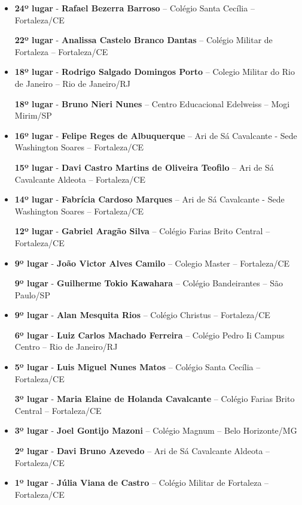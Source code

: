 \documentclass{article}
\begin{document}
\begin{itemize}
\item
\textbf{24º lugar} - \textbf{Rafael Bezerra Barroso} – Colégio Santa Cecília – Fortaleza/CE


\textbf{22º lugar} - \textbf{Analissa Castelo Branco Dantas} – Colégio Militar de Fortaleza – Fortaleza/CE



\item
\textbf{18º lugar} - \textbf{Rodrigo Salgado Domingos Porto} – Colegio Militar do Rio de Janeiro – Rio de Janeiro/RJ


\textbf{18º lugar} - \textbf{Bruno Nieri Nunes} – Centro Educacional Edelweiss – Mogi Mirim/SP



\item
\textbf{16º lugar} - \textbf{Felipe Reges de Albuquerque} – Ari de Sá Cavalcante - Sede Washington Soares – Fortaleza/CE


\textbf{15º lugar} - \textbf{Davi Castro Martins de Oliveira Teofilo} – Ari de Sá Cavalcante Aldeota – Fortaleza/CE



\item
\textbf{14º lugar} - \textbf{Fabrícia Cardoso Marques} – Ari de Sá Cavalcante - Sede Washington Soares – Fortaleza/CE


\textbf{12º lugar} - \textbf{Gabriel Aragão Silva} – Colégio Farias Brito Central – Fortaleza/CE



\item
\textbf{9º lugar} - \textbf{João Victor Alves Camilo} – Colegio Master – Fortaleza/CE


\textbf{9º lugar} - \textbf{Guilherme Tokio Kawahara} – Colégio Bandeirantes – São Paulo/SP



\item
\textbf{9º lugar} - \textbf{Alan Mesquita Rios} – Colégio Christus – Fortaleza/CE


\textbf{6º lugar} - \textbf{Luiz Carlos Machado Ferreira} – Colégio Pedro Ii Campus Centro – Rio de Janeiro/RJ



\item
\textbf{5º lugar} - \textbf{Luis Miguel Nunes Matos} – Colégio Santa Cecília – Fortaleza/CE


\textbf{3º lugar} - \textbf{Maria Elaine de Holanda Cavalcante} – Colégio Farias Brito Central – Fortaleza/CE



\item
\textbf{3º lugar} - \textbf{Joel Gontijo Mazoni} – Colégio Magnum – Belo Horizonte/MG


\textbf{2º lugar} - \textbf{Davi Bruno Azevedo} – Ari de Sá Cavalcante Aldeota – Fortaleza/CE



\item
\textbf{1º lugar} - \textbf{Júlia Viana de Castro} – Colégio Militar de Fortaleza – Fortaleza/CE



\end{itemize}
\end{document}
